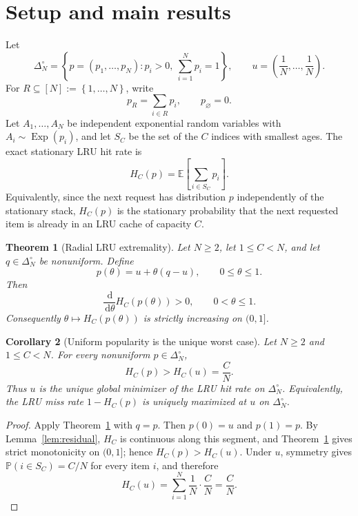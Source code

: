 \documentclass[11pt]{article}
\newtheorem{theorem}{Theorem}[section]
\newtheorem{corollary}[theorem]{Corollary}
\theoremstyle{remark}
\newcommand{\dd}{\,\mathrm{d}}
\newcommand{\E}{\mathbb{E}}
\newcommand{\Pp}{\mathbb{P}}
\newcommand{\Exp}{\operatorname{Exp}}
\newcommand{\set}[1]{\left\{#1\right\}}
\begin{document}
\section{Setup and main results}

Let
\[
        \Delta_N^\circ=
        \set{p=(p_1,\ldots,p_N):p_i>0,\ \sum_{i=1}^N p_i=1},
        \qquad
        u=\left(\frac1N,\ldots,\frac1N\right).
\]
For $R\subseteq [N]:=\set{1,\ldots,N}$, write
\[
        p_R=\sum_{i\in R}p_i,
        \qquad p_\varnothing=0.
\]
Let $A_1,\ldots,A_N$ be independent exponential random variables with
$A_i\sim\Exp(p_i)$, and let $S_C$ be the set of the $C$ indices with
smallest ages.  The exact stationary LRU hit rate is
\begin{equation}\label{eq:HC-def}
        H_C(p)=\E\left[\sum_{i\in S_C}p_i\right].
\end{equation}
Equivalently, since the next request has distribution $p$ independently
of the stationary stack, $H_C(p)$ is the stationary probability that the
next requested item is already in an LRU cache of capacity $C$.

\begin{theorem}[Radial LRU extremality]\label{thm:main}
Let $N\ge2$, let $1\le C<N$, and let $q\in\Delta_N^\circ$ be nonuniform.
Define
\[
        p(\theta)=u+\theta(q-u),\qquad 0\le\theta\le1.
\]
Then
\[
        \frac{\dd}{\dd\theta}H_C(p(\theta))>0,
        \qquad 0<\theta\le1.
\]
Consequently $\theta\mapsto H_C(p(\theta))$ is strictly increasing on
$(0,1]$.
\end{theorem}

\begin{corollary}[Uniform popularity is the unique worst case]\label{cor:global-minimum}
Let $N\ge2$ and $1\le C<N$.  For every nonuniform
$p\in\Delta_N^\circ$,
\[
        H_C(p)>H_C(u)=\frac{C}{N}.
\]
Thus $u$ is the unique global minimizer of the LRU hit rate on
$\Delta_N^\circ$.  Equivalently, the LRU miss rate $1-H_C(p)$ is uniquely
maximized at $u$ on $\Delta_N^\circ$.
\end{corollary}

\begin{proof}
Apply Theorem~\ref{thm:main} with $q=p$.  Then $p(0)=u$ and $p(1)=p$.
By Lemma~\ref{lem:residual}, $H_C$ is continuous along this segment, and
Theorem~\ref{thm:main} gives strict monotonicity on $(0,1]$; hence
$H_C(p)>H_C(u)$.  Under $u$, symmetry gives $\Pp(i\in S_C)=C/N$ for
every item $i$, and therefore
\[
        H_C(u)=\sum_{i=1}^N \frac1N\cdot\frac{C}{N}=\frac{C}{N}.
\]
\end{proof}
\end{document}
